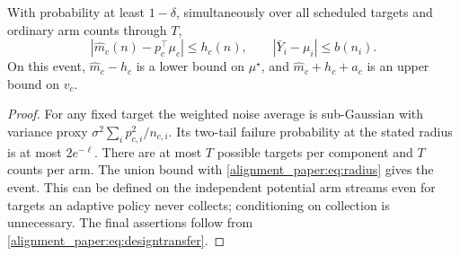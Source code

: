 \begin{lemma}
With probability at least $1-\delta$, simultaneously over all scheduled targets and ordinary arm counts through $T$,
\begin{equation}
 |\widehat m_c(n)-p_c^\top\mu_c|\le h_c(n),\qquad
 |\bar Y_i-\mu_i|\le b(n_i).
 \label{alignment_paper:eq:designevent}
\end{equation}
On this event, $\widehat m_c-h_c$ is a lower bound on $\mu^\star$, and $\widehat m_c+h_c+a_c$ is an upper bound on $v_c$.
\label{alignment_paper:lem:designconfidence}
\end{lemma}
\begin{proof}
For any fixed target the weighted noise average is sub-Gaussian with variance proxy $\sigma^2\sum_i p_{c,i}^2/n_{c,i}$. Its two-tail failure probability at the stated radius is at most $2e^{-\ell}$. There are at most $T$ possible targets per component and $T$ counts per arm. The union bound with \eqref{alignment_paper:eq:radius} gives the event. This can be defined on the independent potential arm streams even for targets an adaptive policy never collects; conditioning on collection is unnecessary. The final assertions follow from \eqref{alignment_paper:eq:designtransfer}.
\end{proof}

